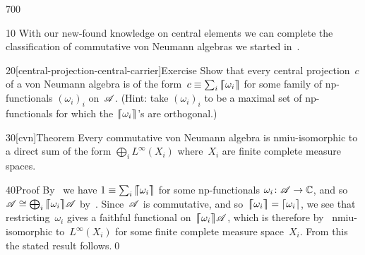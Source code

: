 \begin{parsec}{700}%
\begin{point}{10}%
With our new-found knowledge on central elements
we can complete the classification
of commutative von Neumann algebras
we started in~.
\end{point}
\begin{point}{20}[central-projection-central-carrier]{Exercise}%
Show that every central projection~$c$
of a von Neumann algebra is of
the form~$c\equiv \sum_i \left\lceil\!\!\left\lceil\omega_i\right\rceil\!\!\right\rceil$
for some family of np-functionals $(\omega_i)_i$ on~$\mathscr{A}$.
(Hint: take
    $(\omega_i)_i$ to be a maximal set
    of np-functionals for which the $\left\lceil\!\!\left\lceil\omega_i\right\rceil\!\!\right\rceil$'s are orthogonal.)
\end{point}
\begin{point}{30}[cvn]{Theorem}%
Every commutative von Neumann algebra
is nmiu-isomorphic
to a direct sum of the form  $\bigoplus_i L^\infty(X_i)$
where~$X_i$ are finite complete measure spaces.
\begin{point}{40}{Proof}%
By~
we have $1\equiv \sum_i \left\lceil\!\!\left\lceil\omega_i\right\rceil\!\!\right\rceil $
for some np-functionals $\omega_i\colon \mathscr{A}\to\mathbb{C}$,
and so~$\mathscr{A}\cong \bigoplus_i \left\lceil\!\!\left\lceil\omega_i\right\rceil\!\!\right\rceil\!\mathscr{A}$
by~.
Since~$\mathscr{A}$ is commutative,
and so~$\left\lceil\!\!\left\lceil\omega_i\right\rceil\!\!\right\rceil=\left\lceil\omega_i\right\rceil$,
we see that restricting~$\omega_i$
gives a faithful functional on~$\left\lceil\!\!\left\lceil\omega_i\right\rceil\!\!\right\rceil\!\mathscr{A}$,
which is therefore by~ nmiu-isomorphic to~$L^\infty(X_i)$
for some finite complete measure space~$X_i$.
From this the stated result follows.\qed
\end{point}
\end{point}
\end{parsec}

